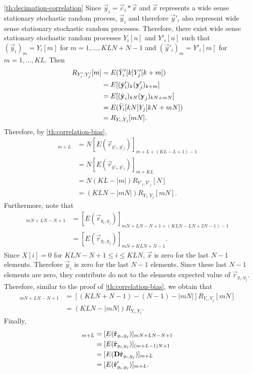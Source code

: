 \documentclass[a4paper, openany, oneside]{memoir}
\begin{document}
\begin{blockProofTheorem}{\ref{th:decimation-correlation}}
    Since $\vec{y}_i = \vec{c}_i \ast \vec{x}$ and $\vec{x}$ represents a wide sense stationary stochastic random process, $\vec{y}_i$ and therefore $\vec{y}'_i$ also represent wide sense stationary stochastic random processes. Therefore, there exist wide sense stationary stochastic random processes $Y_i[n]$ and $Y'_i[n]$ such that $(\vec{y}_i)_m=Y_i[m]$ for $m=1,\ldots,KLN+N-1$ and $(\vec{y}'_i)_m=Y'_i[m]$ for $m=1,\ldots,KL$. Then
    \begin{align*}
        R_{Y'_i,Y'_j}[m]
        &= E(\bar{Y}'_i[k]Y'_j[k+m]) \\
        &= E[(\bar{\boldsymbol{\mathbf{y}}}'_i)_{k}(\boldsymbol{\mathbf{y}}'_j)_{k+m}] \\
        &= E[(\bar{\boldsymbol{\mathbf{y}}}_i)_{kN}(\boldsymbol{\mathbf{y}}_j)_{kN+mN}] \\
        &= E(\bar{Y}_i[kN]Y_j[kN+mN]) \\
        &= R_{Y_i,Y_j}[mN].
    \end{align*}
    Therefore, by \cref{th:correlation-bias},
    \begin{align*}
        [E(N\hat{\vec{r}}_{y'_i,y'_j})]_{m+L}
        &= N[E(\vec{r}_{y'_i,y'_j})]_{m+L+(KL-L+1)-1} \\
        &= N[E(\vec{r}_{y'_i,y'_j})]_{m+KL} \\
        &= N (KL-|m|) R_{Y'_i,Y'_j}[N] \\
        &= (KLN -|mN|) R_{Y_i,Y_j}[mN].
    \end{align*}
    Furthermore, note that
    \begin{align*}
        [E(\hat{\vec{r}}_{y_i,y_j})]_{mN+LN-N+1} &= [E(\vec{r}_{y_i,y_j})]_{mN+LN-N+1 +(KLN-LN+2N-1) - 1} \\
        &=[E(\vec{r}_{y_i,y_j})]_{mN+KLN+N-1}.
    \end{align*}
    Since $X[i]=0$ for $KLN-N+1 \le i \le KLN$, $\vec{x}$ is zero for the last $N-1$ elements. Therefore $\vec{y}_i$ is zero for the last $N-1$ elements. Since these last $N-1$ elements are zero, they contribute do not to the elements expected value of $\vec{r}_{y_i,y_j}$. Therefore, similar to the proof of \cref{th:correlation-bias}, we obtain that
    \begin{align*}
        [E(\hat{\vec{r}}_{y_i,y_j})]_{mN+LN-N+1}
        &= [(KLN + N - 1) - (N - 1) - |mN|] R_{Y_i,Y_j}[mN] \\
        &= (KLN - |mN|) R_{Y_i,Y_j}.
    \end{align*}
    Finally,
    \begin{align*}
        [E(N\hat{\vec{r}}_{y'_i,y'_j})]_{m+L}
        &= [E(\hat{\vec{r}}_{y_i,y_j})]_{mN+LN-N+1} \\
        &= [E(\hat{\vec{r}}_{y_i,y_j})]_{(m+L-1)N+1} \\
        &= [E(\mat{D} \hat{\vec{r}}_{y_i,y_j})]_{m+L} \\
        &= [E(\hat{\vec{r}}'_{y_i,y_j})]_{m+L}.
    \end{align*}
\end{blockProofTheorem}
\end{document}
